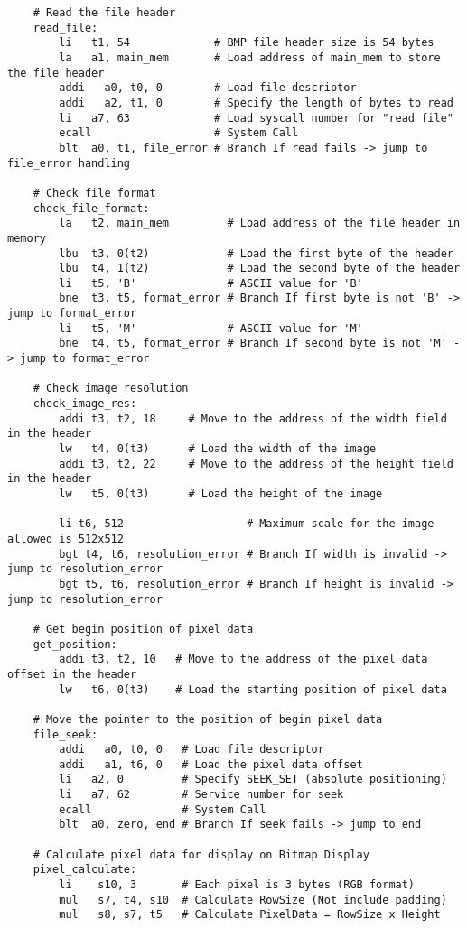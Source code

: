 \documentclass{article}
\begin{document}
\begin{verbatim}
    # Read the file header
    read_file:
        li   t1, 54             # BMP file header size is 54 bytes
        la   a1, main_mem       # Load address of main_mem to store the file header
        addi   a0, t0, 0        # Load file descriptor
        addi   a2, t1, 0        # Specify the length of bytes to read
        li   a7, 63             # Load syscall number for "read file"
        ecall                   # System Call
        blt  a0, t1, file_error # Branch If read fails -> jump to file_error handling
    
    # Check file format
    check_file_format:
        la   t2, main_mem         # Load address of the file header in memory
        lbu  t3, 0(t2)            # Load the first byte of the header 
        lbu  t4, 1(t2)            # Load the second byte of the header 
        li   t5, 'B'              # ASCII value for 'B'
        bne  t3, t5, format_error # Branch If first byte is not 'B' -> jump to format_error 
        li   t5, 'M'              # ASCII value for 'M'
        bne  t4, t5, format_error # Branch If second byte is not 'M' -> jump to format_error 
    
    # Check image resolution
    check_image_res:
        addi t3, t2, 18     # Move to the address of the width field in the header
        lw   t4, 0(t3)      # Load the width of the image
        addi t3, t2, 22     # Move to the address of the height field in the header
        lw   t5, 0(t3)      # Load the height of the image
    
        li t6, 512                   # Maximum scale for the image allowed is 512x512
        bgt t4, t6, resolution_error # Branch If width is invalid -> jump to resolution_error 
        bgt t5, t6, resolution_error # Branch If height is invalid -> jump to resolution_error  
    	
    # Get begin position of pixel data
    get_position:
        addi t3, t2, 10   # Move to the address of the pixel data offset in the header
        lw   t6, 0(t3)    # Load the starting position of pixel data
    
    # Move the pointer to the position of begin pixel data
    file_seek:
        addi   a0, t0, 0   # Load file descriptor	
        addi   a1, t6, 0   # Load the pixel data offset
        li   a2, 0         # Specify SEEK_SET (absolute positioning) 
        li   a7, 62        # Service number for seek
        ecall              # System Call
        blt  a0, zero, end # Branch If seek fails -> jump to end		
    
    # Calculate pixel data for display on Bitmap Display
    pixel_calculate:
        li    s10, 3       # Each pixel is 3 bytes (RGB format)
        mul   s7, t4, s10  # Calculate RowSize (Not include padding)     
        mul   s8, s7, t5   # Calculate PixelData = RowSize x Height
    

\end{verbatim}
\end{document}
